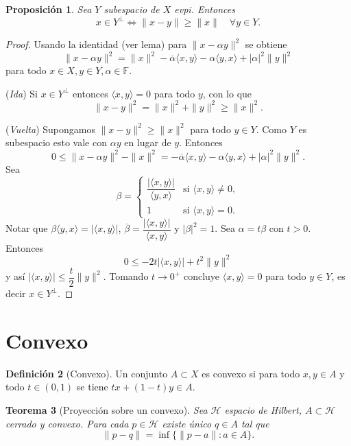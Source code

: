 \documentclass[11pt]{article}
\theoremstyle{definition}
\newtheorem{definition}{Definición}[section]
\theoremstyle{plain}
\newtheorem{proposition}[definition]{Proposición}
\newtheorem{theorem}[definition]{Teorema}
\begin{document}
\begin{proposition}
Sea $Y$ subespacio de $X$ evpi. Entonces
$$x\in Y^{\perp}\iff\|x-y\|\ge\|x\|\quad\forall y\in Y.$$
\end{proposition}
\begin{proof}
Usando la identidad (ver lema) para $\|x-\alpha y\|^2$ se obtiene
$$\|x-\alpha y\|^2=\|x\|^2-\overline{\alpha}\langle x,y\rangle-\alpha\langle y,x\rangle+|\alpha|^2\|y\|^2$$
para todo $x\in X,y\in Y,\alpha\in\mathbb{F}$.

(\emph{Ida}) Si $x\in Y^{\perp}$ entonces $\langle x,y\rangle=0$ para todo $y$, con lo que
$$\|x-y\|^2=\|x\|^2+\|y\|^2\ge\|x\|^2.$$

(\emph{Vuelta}) Supongamos $\|x-y\|^2\ge\|x\|^2$ para todo $y\in Y$. Como $Y$ es subespacio esto vale con $\alpha y$ en lugar de $y$. Entonces
$$0\le\|x-\alpha y\|^2-\|x\|^2=-\overline{\alpha}\langle x,y\rangle-\alpha\langle y,x\rangle+|\alpha|^2\|y\|^2.$$
Sea
$$\beta=\begin{cases}\dfrac{|\langle x,y\rangle|}{\langle y,x\rangle}&\text{si }\langle x,y\rangle\ne0,\\1&\text{si }\langle x,y\rangle=0.\end{cases}$$
Notar que $\beta\langle y,x\rangle=|\langle x,y\rangle|$, $\overline{\beta}=\dfrac{|\langle x,y\rangle|}{\langle x,y\rangle}$ y $|\beta|^2=1$. Sea $\alpha=t\beta$ con $t>0$. Entonces
$$0\le -2t|\langle x,y\rangle|+t^2\|y\|^2$$
y así $|\langle x,y\rangle|\le\dfrac{t}{2}\|y\|^2$. Tomando $t\to0^+$ concluye $\langle x,y\rangle=0$ para todo $y\in Y$, es decir $x\in Y^{\perp}$.
\end{proof}

\section*{Convexo}

\begin{definition}[Convexo]
Un conjunto $A\subset X$ es convexo si para todo $x,y\in A$ y todo $t\in(0,1)$ se tiene $tx+(1-t)y\in A$.
\end{definition}

\begin{theorem}[Proyección sobre un convexo]
Sea $\mathcal{H}$ espacio de Hilbert, $A\subset\mathcal{H}$ cerrado y convexo. Para cada $p\in\mathcal{H}$ existe único $q\in A$ tal que
$$\|p-q\|=\inf\{\|p-a\|:a\in A\}.$$ 
\end{theorem}
\end{document}
